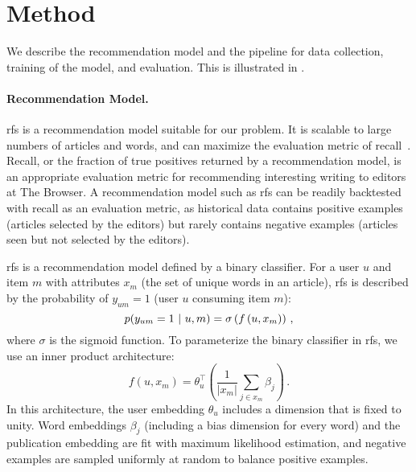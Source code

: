 \section{Method}
We describe the recommendation model and the pipeline for data collection, training of the model, and evaluation. This is illustrated in .

\paragraph{Recommendation Model.} \acrfull{rfs} is a recommendation model suitable for our problem. It is scalable to large numbers of articles and words, and can maximize the evaluation metric of recall~\citep{altosaar2020rankfromsets:,altosaar2020probabilistic}. Recall, or the fraction of true positives returned by a recommendation model, is an appropriate evaluation metric for recommending interesting writing to editors at The Browser. A recommendation model such as \gls{rfs} can be readily backtested with recall as an evaluation metric, as historical data contains positive examples (articles selected by the editors) but rarely contains negative examples (articles seen but not selected by the editors).

\gls{rfs} is a recommendation model defined by a binary classifier. For a user $u$ and item $m$ with attributes $x_m$ (the set of unique words in an article), \gls{rfs} is described by the probability of $y_{um} = 1$ (user $u$ consuming item $m$):
$$p(y_{um} = 1 ~\vert~ u, m) = \sigma\left( f \left (u, x_m\right) \right)\, ,$$
where $\sigma$ is the sigmoid function. To parameterize the binary classifier in \gls{rfs}, we use an inner product architecture:
\begin{equation}
\label{eq:inner-product}
  f\left(u, x_m\right) = \theta_u^\top\left(\frac{1}{|x_m|}\sum_{j\in x_m}
  \beta_j\right)\, .
\end{equation}
In this architecture, the user embedding $\theta_u$ includes a dimension that is fixed to unity. Word embeddings $\beta_j$ (including a bias dimension for every word) and the publication embedding are fit with maximum likelihood estimation, and negative examples are sampled uniformly at random to balance positive examples.

